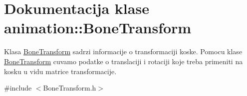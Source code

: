 \hypertarget{classanimation_1_1BoneTransform}{}\section{Dokumentacija klase animation\+:\+:Bone\+Transform}
\label{classanimation_1_1BoneTransform}


Klasa \hyperlink{classanimation_1_1BoneTransform}{Bone\+Transform} sadrzi informacije o transformaciji koske. Pomocu klase \hyperlink{classanimation_1_1BoneTransform}{Bone\+Transform} cuvamo podatke o translaciji i rotaciji koje treba primeniti na kosku u vidu matrice transformacije.  




{\ttfamily \#include $<$Bone\+Transform.\+h$>$}

